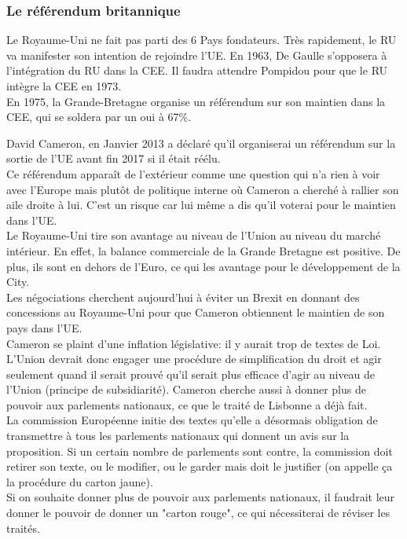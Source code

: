 \documentclass[12pt, a4paper, openany]{book}
\begin{document}
\subsubsection{Le référendum britannique}

Le Royaume-Uni ne fait pas parti des 6 Pays fondateurs. Très rapidement, le RU va manifester son intention de rejoindre l'UE. En 1963, De Gaulle s'opposera à l'intégration du RU dans la CEE. Il faudra attendre Pompidou pour que le RU intègre la CEE en 1973. \\
En 1975, la Grande-Bretagne organise un référendum sur son maintien dans la CEE, qui se soldera par un oui à 67\%. 


David Cameron, en Janvier 2013 a déclaré qu'il organiserai un référendum sur la sortie de l'UE avant fin 2017 si il était réélu. \\
Ce référendum apparaît de l'extérieur comme une question qui n'a rien à voir avec l'Europe mais plutôt de politique interne où Cameron a cherché à rallier son aile droite à lui. C'est un risque car lui même a dis qu'il voterai pour le maintien dans l'UE. \\
Le Royaume-Uni tire son avantage au niveau de l'Union au niveau du marché intérieur. En effet, la balance commerciale de la Grande Bretagne est positive. De plus, ils sont en dehors de l'Euro, ce qui les avantage pour le développement de la City. \\
Les négociations cherchent aujourd'hui à éviter un Brexit en donnant des concessions au Royaume-Uni pour que Cameron obtiennent le maintien de son pays dans l'UE. \\
Cameron se plaint d'une inflation législative: il y aurait trop de textes de Loi. L'Union devrait donc engager une procédure de simplification du droit et agir seulement quand il serait prouvé qu'il serait plus efficace d'agir au niveau de l'Union (principe de subsidiarité). Cameron cherche aussi à donner plus de pouvoir aux parlements nationaux, ce que le traité de Lisbonne a déjà fait. \\
La commission Européenne initie des textes qu'elle a désormais obligation de transmettre à tous les parlements nationaux qui donnent un avis sur la proposition. Si un certain nombre de parlements sont contre, la commission doit retirer son texte, ou le modifier, ou le garder mais doit le justifier (on appelle ça la procédure du carton jaune). \\
Si on souhaite donner plus de pouvoir aux parlements nationaux, il faudrait leur donner le pouvoir de donner un "carton rouge", ce qui nécessiterai de réviser les traités.
\end{document}
